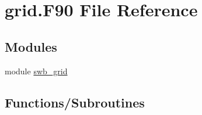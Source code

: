 \hypertarget{grid_8_f90}{
\section{grid.F90 File Reference}
\label{grid_8_f90}
}
\subsection*{Modules}
\begin{DoxyCompactItemize}
\item 
module \hyperlink{namespaceswb__grid}{swb\_\-grid}
\end{DoxyCompactItemize}
\subsection*{Functions/Subroutines}
